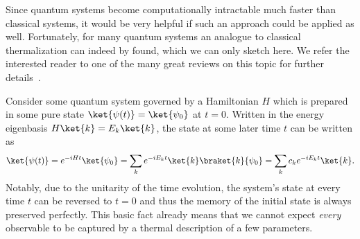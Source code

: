 Since quantum systems become computationally intractable much faster than classical systems, it would be very helpful if such an approach could be applied as well. Fortunately, for many quantum systems an analogue to classical thermalization can indeed by found, which we can only sketch here.
We refer the interested reader to one of the many great reviews on this topic for further details~\cite{gogolinEquilibrationThermalisationEmergence2016,dalessioQuantumChaosEigenstate2016,deutschEigenstateThermalizationHypothesis2018,moriThermalizationPrethermalizationIsolated2018}.

Consider some quantum system governed by a Hamiltonian $H$ which is prepared in some pure state $\ket{\psi(t)}=\ket{\psi_0}$ at $t=0$. Written in the energy eigenbasis $H\ket{k}=E_k\ket{k}$, the state at some later time $t$ can be written as
\begin{equation}
	\ket{\psi(t)} = e^{-iHt}\ket{\psi_0} = \sum_k e^{-iE_kt}\ket{k}\braket{k}{\psi_0}	= \sum_k c_k e^{-iE_kt}\ket{k}.
\end{equation}
Notably, due to the unitarity of the time evolution, the system's state at every time $t$ can be reversed to $t=0$ and thus the memory of the initial state is always preserved perfectly. This basic fact already means that we cannot expect \emph{every} observable to be captured by a thermal description of a few parameters.

